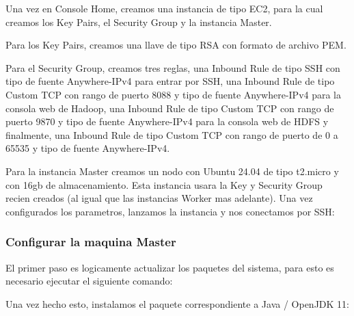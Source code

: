 \documentclass[9pt,letterpaper,twoside]{article}
\begin{document}
\noindent
Una vez en Console Home, creamos una instancia de tipo EC2, para la cual creamos los Key Pairs, el Security Group y la instancia
Master.

\noindent
Para los Key Pairs, creamos una llave de tipo RSA con formato de archivo PEM.

\noindent
Para el Security Group, creamos tres reglas, 
una Inbound Rule de tipo SSH con tipo de fuente Anywhere-IPv4
para entrar por SSH,
una Inbound Rule de tipo Custom TCP con rango de puerto 8088 y tipo de fuente Anywhere-IPv4
para la consola web de Hadoop,
una Inbound Rule de tipo Custom TCP con rango de puerto 9870 y tipo de fuente Anywhere-IPv4
para la consola web de HDFS
y finalmente, una Inbound Rule de tipo Custom TCP con rango de puerto de 0 a 65535 y tipo de 
fuente Anywhere-IPv4.

\noindent
Para la instancia Master creamos un nodo con Ubuntu 24.04 de tipo t2.micro y con 16gb de almacenamiento.
Esta instancia usara la Key y Security Group recien creados (al igual que las instancias Worker mas adelante). 
Una vez configurados los parametros, lanzamos la instancia y nos conectamos por SSH:

\begin{code}[H]
    
\end{code}

\subsubsection*{Configurar la maquina Master}

\noindent
El primer paso es logicamente actualizar los paquetes del sistema, para esto es necesario ejecutar el siguiente
comando:

\begin{code}[H]
    
\end{code}

\noindent
Una vez hecho esto, instalamos el paquete correspondiente a Java / OpenJDK 11:

\begin{code}[H]
    
\end{code}
\end{document}
